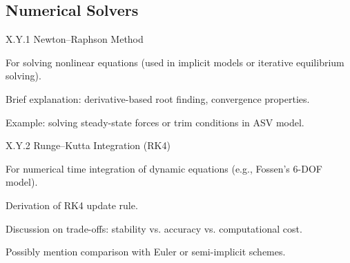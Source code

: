 \subsection{Numerical Solvers}
X.Y.1 Newton–Raphson Method

For solving nonlinear equations (used in implicit models or iterative equilibrium solving).

Brief explanation: derivative-based root finding, convergence properties.

Example: solving steady-state forces or trim conditions in ASV model.

X.Y.2 Runge–Kutta Integration (RK4)

For numerical time integration of dynamic equations (e.g., Fossen’s 6-DOF model).

Derivation of RK4 update rule.

Discussion on trade-offs: stability vs. accuracy vs. computational cost.

Possibly mention comparison with Euler or semi-implicit schemes.